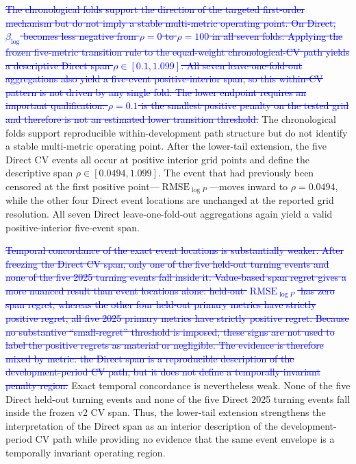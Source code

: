 \documentclass[10pt]{article}
\theoremstyle{definition}
\newcommand{\1}{\mathbf{1}}
\newcommand{\oldtext}[1]{\textcolor{blue}{\sout{#1}}}
\newcommand{\latesttext}[1]{\textcolor{latestPurple}{#1}}
\newenvironment{oldrevisionblock}{%
  \begingroup
  \begin{tcolorbox}[
    enhanced,breakable,
    colback=white,colframe=white,boxrule=0pt,
    left=0pt,right=0pt,top=1pt,bottom=1pt,
    coltext=blue,
    overlay unbroken={\draw[blue,line width=.45pt] (frame.south west)--(frame.north east);\draw[blue,line width=.45pt] (frame.north west)--(frame.south east);},
    overlay first={\draw[blue,line width=.45pt] (frame.south west)--(frame.north east);},
    overlay middle={\draw[blue,line width=.45pt] (frame.south west)--(frame.north east);},
    overlay last={\draw[blue,line width=.45pt] (frame.north west)--(frame.south east);}
  ]
}{\end{tcolorbox}\endgroup}
\begin{document}
\begin{oldrevisionblock}
\oldtext{The chronological folds support the direction of the targeted first-order mechanism but do not imply a stable multi-metric operating point. On Direct, $\beta_{\log}$ becomes less negative from $\rho=0$ to $\rho=100$ in all seven folds. Applying the frozen five-metric transition rule to the equal-weight chronological-CV path yields a descriptive Direct span $\rho\in[0.1,1.099]$. All seven leave-one-fold-out aggregations also yield a five-event positive-interior span, so this within-CV pattern is not driven by any single fold. The lower endpoint requires an important qualification: $\rho=0.1$ is the smallest positive penalty on the tested grid and therefore is not an estimated lower transition threshold.}
\latesttext{The chronological folds support reproducible within-development path structure but do not identify a stable multi-metric operating point. After the lower-tail extension, the five Direct CV events all occur at positive interior grid points and define the descriptive span $\rho\in[0.0494,1.099]$. The event that had previously been censored at the first positive point---$\operatorname{RMSE}_{\log P}$---moves inward to $\rho=0.0494$, while the other four Direct event locations are unchanged at the reported grid resolution. All seven Direct leave-one-fold-out aggregations again yield a valid positive-interior five-event span.}

\oldtext{Temporal concordance of the exact event locations is substantially weaker. After freezing the Direct CV span, only one of the five held-out turning events and none of the five 2025 turning events fall inside it. Value-based span regret gives a more nuanced result than event locations alone: held-out $\operatorname{RMSE}_{\log P}$ has zero span regret, whereas the other four held-out primary metrics have strictly positive regret; all five 2025 primary metrics have strictly positive regret. Because no substantive ``small-regret'' threshold is imposed, these signs are not used to label the positive regrets as material or negligible. The evidence is therefore mixed by metric: the Direct span is a reproducible description of the development-period CV path, but it does not define a temporally invariant penalty region.}
\latesttext{Exact temporal concordance is nevertheless weak. None of the five Direct held-out turning events and none of the five Direct 2025 turning events fall inside the frozen v2 CV span. Thus, the lower-tail extension strengthens the interpretation of the Direct span as an interior description of the development-period CV path while providing no evidence that the same event envelope is a temporally invariant operating region.}


\end{oldrevisionblock}
\end{document}
